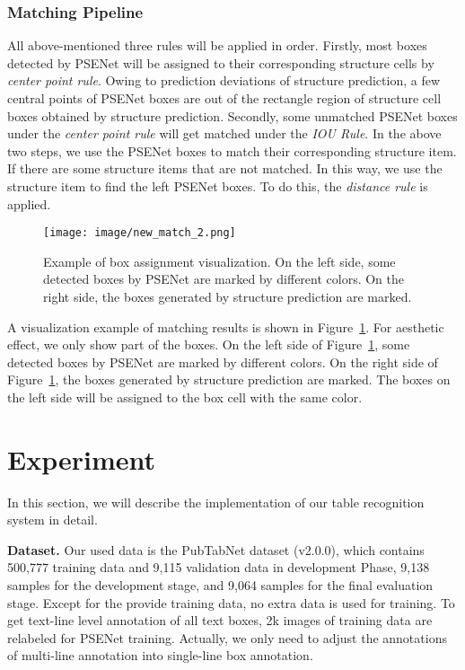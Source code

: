\documentclass{article}
\begin{document}
\subsubsection{Matching Pipeline}
All above-mentioned three rules will be applied in order. Firstly, most boxes detected by PSENet will be assigned to their corresponding structure cells by \emph{center point rule}. Owing to prediction deviations of structure prediction, a few central points of PSENet boxes are out of the rectangle region of structure cell boxes obtained by structure prediction. Secondly, some unmatched PSENet boxes under the \emph{center point rule} will get matched under the \emph{IOU Rule}. In the above two steps, we use the PSENet boxes to match their corresponding structure item. If there are some structure items that are not matched. In this way, we use the structure item to find the left PSENet boxes. To do this, the \emph{distance rule} is applied.


\begin{figure}[h] \centering
    \texttt{[image: image/new\_match\_2.png]}
    \caption{Example of box assignment visualization. On the left side, some detected boxes by PSENet are marked by different colors. On the right side, the boxes generated by structure prediction are marked.}
    \label{fig:matchingresults}
\end{figure}



A visualization example of matching results is shown in Figure~\ref{fig:matchingresults}. For aesthetic effect, we only show part of the boxes.
On the left side of Figure~\ref{fig:matchingresults}, some detected boxes by PSENet are marked by different colors. On the right side of Figure~\ref{fig:matchingresults}, the boxes generated by structure prediction are marked. The boxes on the left side will be assigned to the box cell with the same color. 






\section{Experiment}
\label{sec:others}
In this section, we will describe the implementation of our table recognition system in detail. 


{\bf{Dataset.}} Our used data is the PubTabNet dataset (v2.0.0), which contains 500,777 training data and 9,115 validation data in development Phase, 9,138 samples for the development stage, and 9,064 samples for the final evaluation stage.
Except for the provide training data, no extra data is used for training. To get text-line level annotation of all text boxes, 2k images of training data are relabeled for PSENet training. Actually, we only need to adjust the annotations of multi-line annotation into single-line box annotation.
\end{document}
